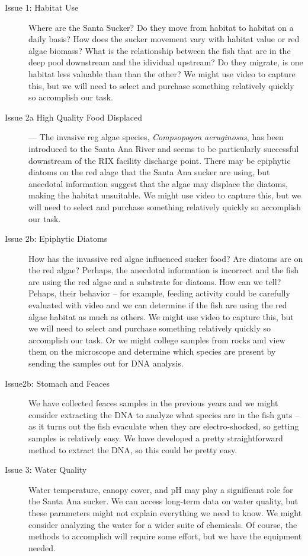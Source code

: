 \documentclass{tufte-handout}\usepackage[]{graphicx}\usepackage[]{color}
\begin{document}
\begin{description}
  \item[Issue 1: Habitat Use] Where are the Santa Sucker?  Do they move from habitat to habitat on a daily basis? How does the sucker movement vary with habitat value or red algae biomass? What is the relationship between the fish that are in the deep pool downstream and the idividual upstream? Do they migrate, is one habitat less valuable than than the other? We might use video to capture this, but we will need to select and purchase something relatively quickly so accomplish our task.
  
  \item[Issue 2a High Quality Food Displaced]  --- The invasive reg algae species, \emph{Compsopogon aeruginosus}, has been introduced to the Santa Ana River and seems to be particularly successful downstream of the RIX facility discharge point. There may be epiphytic diatoms on the red alage that the Santa Ana sucker are using, but anecdotal information suggest that the algae may displace the diatoms, making the habitat unsuitable. We might use video to capture this, but we will need to select and purchase something relatively quickly so accomplish our task. 
  
  \item[Issue 2b: Epiphytic Diatoms] How has the invassive red algae influenced sucker food? Are diatoms are on the red algae? Perhaps, the anecdotal information is incorrect and the fish are using the red algae and a substrate for diatoms. How can we tell?  Pehaps, their behavior -- for example, feeding activity could be carefully evaluated with video and we can determine if the fish are using the red algae habitat as much as others. We might use video to capture this, but we will need to select and purchase something relatively quickly so accomplish our task. Or we might college samples from rocks and view them on the microscope and determine which species are present by sending the samples out for DNA analysis.

  \item[Issue2b: Stomach and Feaces] We have collected feaces samples in the previous years and we might consider extracting the DNA to analyze what species are in the fish guts -- as it turns out the fish evaculate when they are electro-shocked, so getting samples is relatively easy. We have developed a pretty straightforward method to extract the DNA, so this could be pretty easy.
  
  \item[Issue 3: Water Quality] Water temperature, canopy cover, and pH may play a significant role for the Santa Ana sucker. We can access long-term data on water quality, but these parameters might not explain everything we need to know. We might consider analyzing the water for a wider suite of chemicals. Of course, the methods to accomplish will require some effort, but we have the equipment needed.
  

\end{description}
\end{document}
